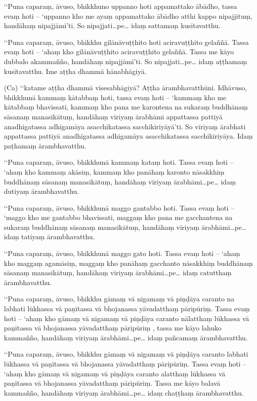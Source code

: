 ‘‘Puna caparaṃ, āvuso, bhikkhuno uppanno hoti appamattako ābādho, tassa evaṃ hoti – ‘uppanno kho me ayaṃ appamattako ābādho atthi kappo nipajjituṃ, handāhaṃ nipajjāmī’ti. So nipajjati…pe… idaṃ sattamaṃ kusītavatthu.

‘‘Puna caparaṃ, āvuso, bhikkhu gilānāvuṭṭhito hoti aciravuṭṭhito gelaññā. Tassa evaṃ hoti – ‘ahaṃ kho gilānāvuṭṭhito aciravuṭṭhito gelaññā. Tassa me kāyo dubbalo akammañño, handāhaṃ nipajjāmī’ti. So nipajjati…pe… idaṃ aṭṭhamaṃ kusītavatthu. Ime aṭṭha dhammā hānabhāgiyā.

(Ca) ‘‘katame aṭṭha dhammā visesabhāgiyā? Aṭṭha ārambhavatthūni. Idhāvuso, bhikkhunā kammaṃ kātabbaṃ hoti, tassa evaṃ hoti – ‘kammaṃ kho me kātabbaṃ bhavissati, kammaṃ kho pana me karontena na sukaraṃ buddhānaṃ sāsanaṃ manasikātuṃ, handāhaṃ vīriyaṃ ārabhāmi appattassa pattiyā anadhigatassa adhigamāya asacchikatassa sacchikiriyāyā’ti. So vīriyaṃ ārabhati appattassa pattiyā anadhigatassa adhigamāya asacchikatassa sacchikiriyāya. Idaṃ paṭhamaṃ ārambhavatthu.

‘‘Puna caparaṃ, āvuso, bhikkhunā kammaṃ kataṃ hoti. Tassa evaṃ hoti – ‘ahaṃ kho kammaṃ akāsiṃ, kammaṃ kho panāhaṃ karonto nāsakkhiṃ buddhānaṃ sāsanaṃ manasikātuṃ, handāhaṃ vīriyaṃ ārabhāmi…pe… idaṃ dutiyaṃ ārambhavatthu.

‘‘Puna caparaṃ, āvuso, bhikkhunā maggo gantabbo hoti. Tassa evaṃ hoti – ‘maggo kho me gantabbo bhavissati, maggaṃ kho pana me gacchantena na sukaraṃ buddhānaṃ sāsanaṃ manasikātuṃ, handāhaṃ vīriyaṃ ārabhāmi…pe… idaṃ tatiyaṃ ārambhavatthu.

‘‘Puna caparaṃ, āvuso, bhikkhunā maggo gato hoti. Tassa evaṃ hoti – ‘ahaṃ kho maggaṃ agamāsiṃ, maggaṃ kho panāhaṃ gacchanto nāsakkhiṃ buddhānaṃ sāsanaṃ manasikātuṃ, handāhaṃ vīriyaṃ ārabhāmi…pe… idaṃ catutthaṃ ārambhavatthu.

‘‘Puna caparaṃ, āvuso, bhikkhu gāmaṃ vā nigamaṃ vā piṇḍāya caranto na labhati lūkhassa vā paṇītassa vā bhojanassa yāvadatthaṃ pāripūriṃ. Tassa evaṃ hoti – ‘ahaṃ kho gāmaṃ vā nigamaṃ vā piṇḍāya caranto nālatthaṃ lūkhassa vā paṇītassa vā bhojanassa yāvadatthaṃ pāripūriṃ , tassa me kāyo lahuko kammañño, handāhaṃ vīriyaṃ ārabhāmi…pe… idaṃ pañcamaṃ ārambhavatthu.

‘‘Puna caparaṃ, āvuso, bhikkhu gāmaṃ vā nigamaṃ vā piṇḍāya caranto labhati lūkhassa vā paṇītassa vā bhojanassa yāvadatthaṃ pāripūriṃ. Tassa evaṃ hoti – ‘ahaṃ kho gāmaṃ vā nigamaṃ vā piṇḍāya caranto alatthaṃ lūkhassa vā paṇītassa vā bhojanassa yāvadatthaṃ pāripūriṃ. Tassa me kāyo balavā kammañño, handāhaṃ vīriyaṃ ārabhāmi…pe… idaṃ chaṭṭhaṃ ārambhavatthu.

